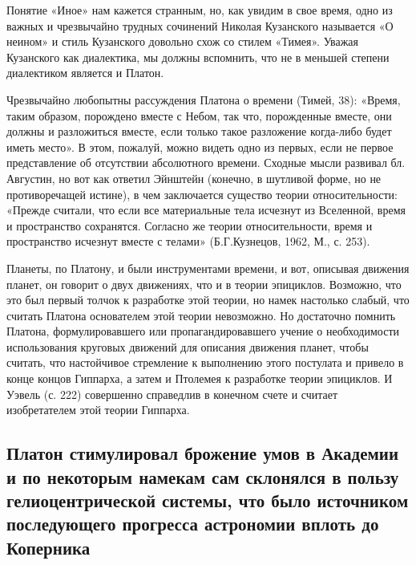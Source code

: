 Понятие «Иное» нам кажется странным, но, как увидим в свое время, одно
из важных и чрезвычайно трудных сочинений Николая Кузанского
называется «О неином» и стиль Кузанского довольно схож со стилем
«Тимея». Уважая Кузанского как диалектика, мы должны вспомнить, что не
в меньшей степени диалектиком является и Платон.

Чрезвычайно любопытны рассуждения Платона о времени (Тимей, 38):
«Время, таким образом, порождено вместе с Небом, так что, порожденные
вместе, они должны и разложиться вместе, если только такое разложение
когда-либо будет иметь место». В этом, пожалуй, можно видеть одно из
первых, если не первое представление об отсутствии абсолютного
времени. Сходные мысли развивал бл. Августин, но вот как ответил
Эйнштейн (конечно, в шутливой форме, но не противоречащей истине), в
чем заключается существо теории относительности: «Прежде считали, что
если все материальные тела исчезнут из Вселенной, время и пространство
сохранятся. Согласно же теории относительности, время и пространство
исчезнут вместе с телами» (Б.Г.Кузнецов, 1962, М., с. 253).

Планеты, по Платону, и были инструментами времени, и вот, описывая
движения планет, он говорит о двух движениях, что и в теории
эпициклов. Возможно, что это был первый толчок к разработке этой
теории, но намек настолько слабый, что считать Платона основателем
этой теории невозможно. Но достаточно помнить Платона,
формулировавшего или пропагандировавшего учение о необходимости
использования круговых движений для описания движения планет, чтобы
считать, что настойчивое стремление к выполнению этого постулата и
привело в конце концов Гиппарха, а затем и Птолемея к разработке
теории эпициклов. И Уэвель (с. 222) совершенно справедлив в конечном
счете и считает изобретателем этой теории Гиппарха.

\subsection{Платон стимулировал брожение умов в Академии и по
некоторым намекам сам склонялся в пользу гелиоцентрической
системы, что было источником последующего прогресса астрономии
вплоть до Коперника}

